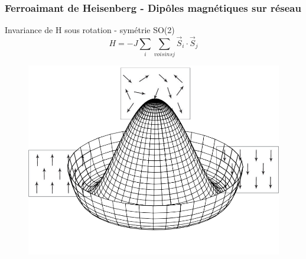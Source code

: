 \documentclass[handout]{beamer}
\begin{document}
\begin{frame}
\frametitle{Ferroaimant de Heisenberg - Dipôles magnétiques sur réseau}
Invariance de H sous rotation - symétrie SO(2)\\
\begin{equation*}
H= -J\sum_{i}{\sum_{voisins j}{\vec{S}_i\cdot\vec{S}_j}}
\end{equation*} 
 \begin{figure}[0.5\textwidth]
   \includegraphics[scale=0.25]{potpot.png}

 \end{figure}

\end{frame}
%
%    
\end{document}
